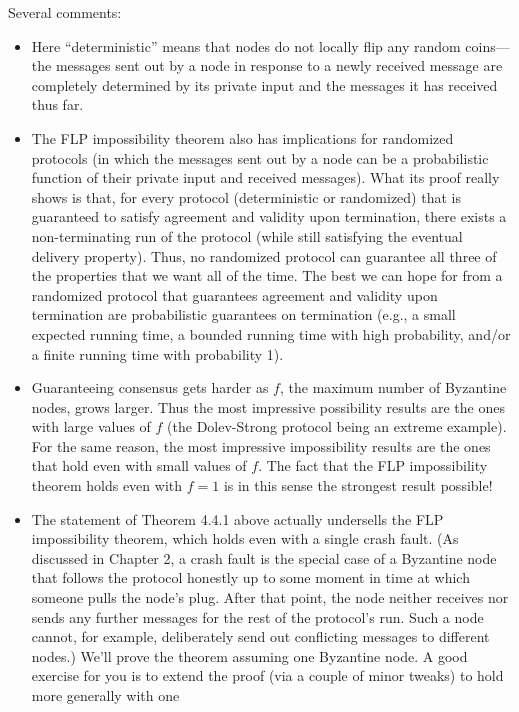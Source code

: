 Several comments:\\
\begin{itemize}
    \item Here “deterministic” means that nodes do not locally flip any random coins—the messages sent out by a node in response to a newly received message are completely
    determined by its private input and the messages it has received thus far.
    \item The FLP impossibility theorem also has implications for randomized protocols (in
    which the messages sent out by a node can be a probabilistic function of their private
    input and received messages). What its proof really shows is that, for every protocol
    (deterministic or randomized) that is guaranteed to satisfy agreement and validity upon
    termination, there exists a non-terminating run of the protocol (while still satisfying
    the eventual delivery property). Thus, no randomized protocol can guarantee all three of the properties that we want all of the time. The best we can hope for from a
    randomized protocol that guarantees agreement and validity upon termination are
    probabilistic guarantees on termination (e.g., a small expected running time, a bounded
    running time with high probability, and/or a finite running time with probability 1).
    \item Guaranteeing consensus gets harder as $f$, the maximum number of Byzantine nodes,
    grows larger. Thus the most impressive possibility results are the ones with large values
    of $f$ (the Dolev-Strong protocol being an extreme example). For the same reason, the
    most impressive impossibility results are the ones that hold even with small values
    of $f$. The fact that the FLP impossibility theorem holds even with $f = 1$ is in this
    sense the strongest result possible!
    \item The statement of Theorem 4.4.1 above actually undersells the FLP impossibility theorem,
    which holds even with a single crash fault. (As discussed in Chapter 2, a crash fault
    is the special case of a Byzantine node that follows the protocol honestly up to some
    moment in time at which someone pulls the node’s plug. After that point, the node
    neither receives nor sends any further messages for the rest of the protocol’s run. Such
    a node cannot, for example, deliberately send out conflicting messages to different
    nodes.) We’ll prove the theorem assuming one Byzantine node. A good exercise for you
    is to extend the proof (via a couple of minor tweaks) to hold more generally with one

\end{itemize}
